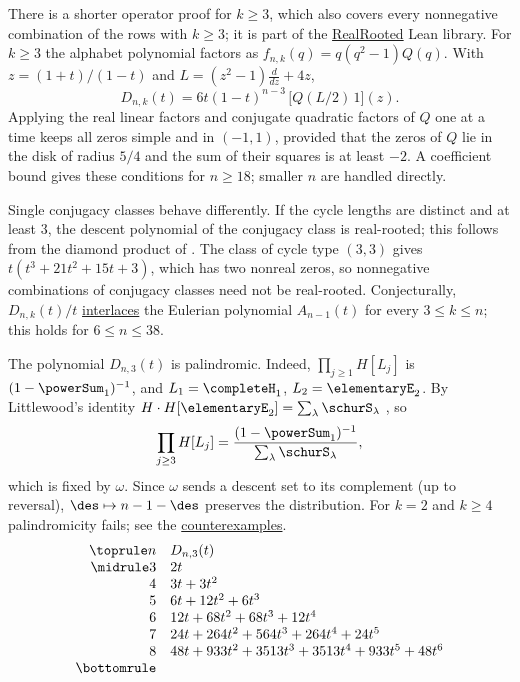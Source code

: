 \begin{example*}
There is a shorter operator proof for $k\geq3$, which also covers every
nonnegative combination of the rows with $k\geq3$; it is part of the
\href{https://github.com/PerAlexandersson/RealRooted}{RealRooted} Lean
library.  For $k\geq3$ the alphabet polynomial factors as
$f_{n,k}(q)=q(q^2-1)Q(q)$.  With $z=(1+t)/(1-t)$ and
$L=(z^2-1)\frac{d}{dz}+4z$,
\[
  D_{n,k}(t)=6t(1-t)^{n-3}\,\bigl[Q(L/2)\,1\bigr](z).
\]
Applying the real linear factors and conjugate quadratic factors of $Q$ one at
a time keeps all zeros simple and
in $(-1,1)$, provided that the zeros of $Q$ lie in the disk of radius $5/4$
and the sum of their squares is at least $-2$.  A coefficient bound gives
these conditions for $n\geq18$; smaller $n$ are handled directly.

Single conjugacy classes behave differently.  If the cycle lengths are
distinct and at least $3$, the descent polynomial of the conjugacy class is
real-rooted; this follows from the diamond product of 
\cite{Branden2006}.  The class of cycle type $(3,3)$ gives
$t(t^3+21t^2+15t+3)$, which has two nonreal zeros, so nonnegative
combinations of conjugacy classes need not be real-rooted.  Conjecturally,
$D_{n,k}(t)/t$ \hyperref[interlacesPolynomial]{interlaces} the Eulerian
polynomial $A_{n-1}(t)$ for every $3\leq k\leq n$; this holds for
$6\leq n\leq38$.

The polynomial $D_{n,3}(t)$ is palindromic.  Indeed, $\prod_{j\geq1}H[L_j]$
is $(1-\powerSum_1)^{-1}$, and $L_1=\completeH_1$, $L_2=\elementaryE_2$.
By Littlewood's identity $H\cdot H[\elementaryE_2]=\sum_\lambda\schurS_\lambda$
\cite[Ex.~I.5.4]{Macdonald1995}, so
\[
  \prod_{j\geq3}H[L_j]=\frac{(1-\powerSum_1)^{-1}}{\sum_\lambda\schurS_\lambda},
\]
which is fixed by $\omega$.  Since $\omega$ sends a descent set to its
complement (up to reversal), $\des\mapsto n-1-\des$ preserves the
distribution.  For $k=2$ and $k\geq4$ palindromicity fails; see the
\hyperref[counterexamplesPalindromic]{counterexamples}.
\[
\begin{array}{rl}
\toprule
n & D_{n,3}(t) \\
\midrule
3 & 2t \\
4 & 3t+3t^2 \\
5 & 6t+12t^2+6t^3 \\
6 & 12t+68t^2+68t^3+12t^4 \\
7 & 24t+264t^2+564t^3+264t^4+24t^5 \\
8 & 48t+933t^2+3513t^3+3513t^4+933t^5+48t^6 \\
\bottomrule
\end{array}
\]
\end{example*}
